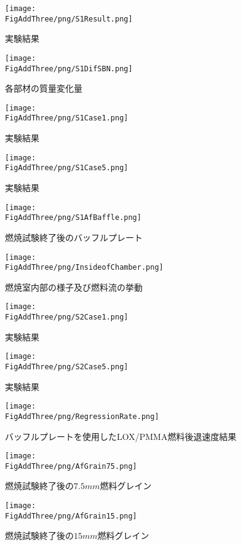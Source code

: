 \begin{figure}
\centering
\caption{実験結果}
\texttt{[image: \\FigAddThree/png/S1Result.png]}
\label{tab:S1Result}
\end{figure}

\begin{figure}
\centering
\caption{各部材の質量変化量}
\texttt{[image: \\FigAddThree/png/S1DifSBN.png]}
\label{tab:S1DifSBN}
\end{figure}

\begin{figure}
\centering
\texttt{[image: \\FigAddThree/png/S1Case1.png]}
\caption{実験結果}
\label{fig:S1Case1}
\end{figure}

\begin{figure}
\centering
\texttt{[image: \\FigAddThree/png/S1Case5.png]}
\caption{実験結果}
\label{fig:S1Case5}
\end{figure}

\begin{figure}
\centering
\texttt{[image: \\FigAddThree/png/S1AfBaffle.png]}
\caption{燃焼試験終了後のバッフルプレート}
\label{fig:S1AfBaffle}
\end{figure}

\begin{figure}
\centering
\texttt{[image: \\FigAddThree/png/InsideofChamber.png]}
\caption{燃焼室内部の様子及び燃料流の挙動}
\label{fig:InsideofChamber}
\end{figure}


\begin{figure}
\centering
\texttt{[image: \\FigAddThree/png/S2Case1.png]}
\caption{実験結果}
\label{fig:S2Case1}
\end{figure}

\begin{figure}
\centering
\texttt{[image: \\FigAddThree/png/S2Case5.png]}
\caption{実験結果}
\label{fig:S1Case5}
\end{figure}

\begin{figure}
\centering
\texttt{[image: \\FigAddThree/png/RegressionRate.png]}
\caption{バッフルプレートを使用したLOX/PMMA燃料後退速度結果}
\label{fig:S2Case1Grain}
\end{figure}

\begin{figure}
\centering
\texttt{[image: \\FigAddThree/png/AfGrain75.png]}
\caption{燃焼試験終了後の$7.5mm$燃料グレイン}
\label{fig:S2Case1Grain}
\end{figure}

\begin{figure}
\centering
\texttt{[image: \\FigAddThree/png/AfGrain15.png]}
\caption{燃焼試験終了後の$15mm$燃料グレイン}
\label{fig:S2Case5Grain}
\end{figure}
